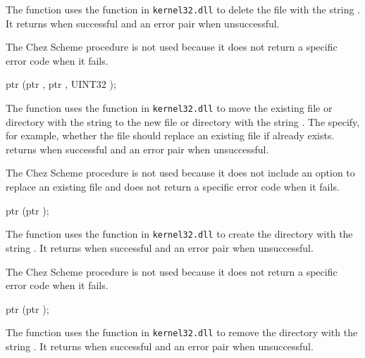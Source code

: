 The  function uses the 
function in \texttt{kernel32.dll} to delete the file with the string
. It returns  when successful and an error pair
when unsuccessful.

The Chez Scheme procedure  is not used because it
does not return a specific error code when it fails.

\begin{function}
  ptr (ptr , ptr
  , UINT32 );
\end{function}\antipar

The  function uses the 
function in \texttt{kernel32.dll} to move the existing file or
directory with the string  to the new file or
directory with the string . The  specify, for
example, whether the file should replace an existing file if
 already exists.  returns
 when successful and an error pair when unsuccessful.

The Chez Scheme procedure  is not used because it
does not include an option to replace an existing file and does not
return a specific error code when it fails.

\begin{function}
  ptr (ptr );
\end{function}\antipar

The  function uses the
 function in \texttt{kernel32.dll} to create
the directory with the string . It returns  when
successful and an error pair when unsuccessful.

The Chez Scheme procedure  is not used because it does
not return a specific error code when it fails.

\begin{function}
  ptr (ptr );
\end{function}\antipar

The  function uses the
 function in \texttt{kernel32.dll} to remove
the directory with the string . It returns  when
successful and an error pair when unsuccessful.

